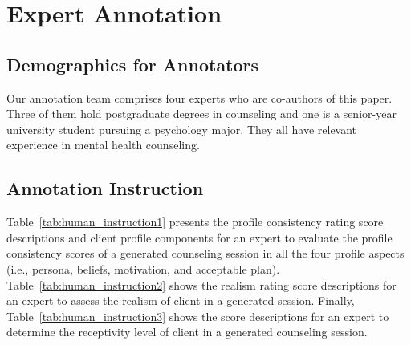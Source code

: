 \section{Expert Annotation}
\label{app:human evaluation}


\subsection{Demographics for Annotators}

Our annotation team comprises four experts who are co-authors of this paper. Three of them hold postgraduate degrees in counseling and one is a senior-year university student pursuing a psychology major. They all have relevant experience in mental health counseling.

\subsection{Annotation Instruction}

Table~\ref{tab:human_instruction1} presents the profile consistency rating score descriptions and client profile components for an expert to evaluate the profile consistency scores of a generated counseling session in all the four profile aspects (i.e., persona, beliefs, motivation, and acceptable plan). Table~\ref{tab:human_instruction2} shows the realism rating score descriptions for an expert to assess the realism of client in a generated session. Finally, Table~\ref{tab:human_instruction3} shows the score descriptions for an expert to determine the receptivity level of client in a generated counseling session.

